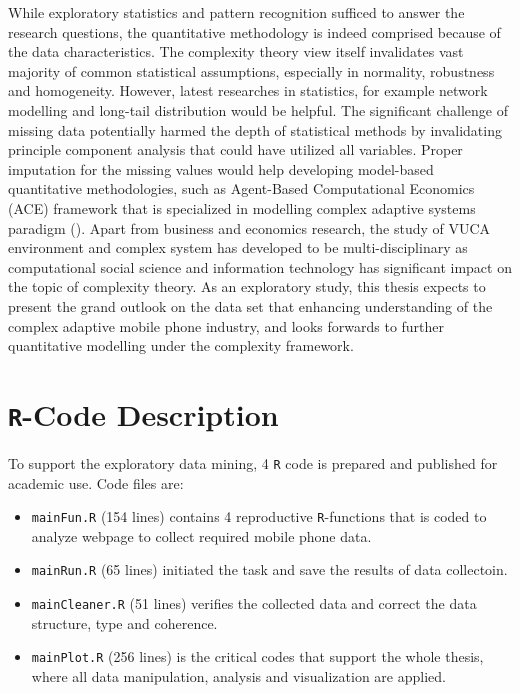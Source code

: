 \documentclass[utf8,english]{gradu3}
\begin{document}
While exploratory statistics and pattern recognition sufficed to answer the research questions, the quantitative methodology is indeed comprised because of the data characteristics. The complexity theory view itself invalidates vast majority of common statistical assumptions, especially in normality, robustness and homogeneity. However, latest researches in statistics, for example network modelling and long-tail distribution would be helpful. The significant challenge of missing data potentially harmed the depth of statistical methods by invalidating principle component analysis that could have utilized all variables. Proper imputation for the missing values would help developing model-based quantitative methodologies, such as Agent-Based Computational Economics (ACE) framework that is specialized in modelling complex adaptive systems paradigm (\cite{tesfatsion2003agent}). Apart from business and economics research, the study of VUCA environment and complex system has developed to be multi-disciplinary as computational social science and information technology has significant impact on the topic of complexity theory. As an exploratory study, this thesis expects to present the grand outlook on the data set that enhancing understanding of the complex adaptive mobile phone industry, and looks forwards to further quantitative modelling under the complexity framework.

\printbibliography

\appendix

\section{\texttt{R}-Code Description}
\label{app:rcode}
To support the exploratory data mining, 4 \texttt{R} code is prepared and published for academic use. Code files are:

\begin{itemize}
\item \texttt{mainFun.R} (154 lines) contains 4 reproductive \texttt{R}-functions that is coded to analyze webpage to collect required mobile phone data.
\item \texttt{mainRun.R} (65 lines) initiated the task and save the results of data collectoin.
\item \texttt{mainCleaner.R} (51 lines) verifies the collected data and correct the data structure, type and coherence.
\item \texttt{mainPlot.R} (256 lines) is the critical codes that support the whole thesis, where all data manipulation, analysis and visualization are applied.
\end{itemize}
\end{document}
